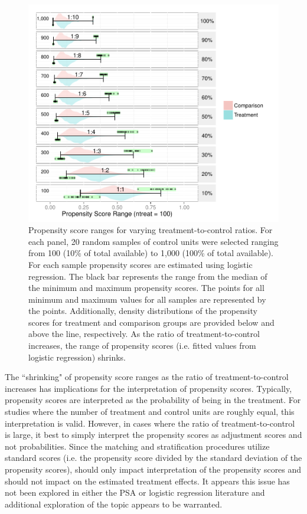 \documentclass[letterpaper,12pt]{article} %
\begin{document}
\setlength{\belowcaptionskip}{-20pt}
\begin{figure}[t!]
\begin{center}
\includegraphics[width=\textwidth,trim=0 0 0 .2in]{../Figures2009/PSRanges.pdf}
\caption[Propensity score ranges for varying treatment-to-control ratios]{Propensity score ranges for varying treatment-to-control ratios. For each panel, 20 random samples of control units were selected ranging from 100 (10\% of total available) to 1,000 (100\% of total available). For each sample propensity scores are estimated using logistic regression. The black bar represents the range from the median of the minimum and maximum propensity scores. The points for all minimum and maximum values for all samples are represented by the points. Additionally, density distributions of the propensity scores for treatment and comparison groups are provided below and above the line, respectively. As the ratio of treatment-to-control increases, the range of propensity scores (i.e. fitted values from logistic regression) shrinks.}
\label{fig:psranges}
\end{center}
\end{figure}
\setlength{\belowcaptionskip}{0pt}


The ``shrinking" of propensity score ranges as the ratio of treatment-to-control increases has implications for the interpretation of propensity scores. Typically, propensity scores are interpreted as the probability of being in the treatment. For studies where the number of treatment and control units are roughly equal, this interpretation is valid. However, in cases where the ratio of treatment-to-control is large, it best to simply interpret the propensity scores as adjustment scores and not probabilities. Since the matching and stratification procedures utilize standard scores (i.e. the propensity score divided by the standard deviation of the propensity scores), should only impact interpretation of the propensity scores and should not impact on the estimated treatment effects. It appears this issue has not been explored in either the PSA or logistic regression literature and additional exploration of the topic appears to be warranted.
\end{document}
